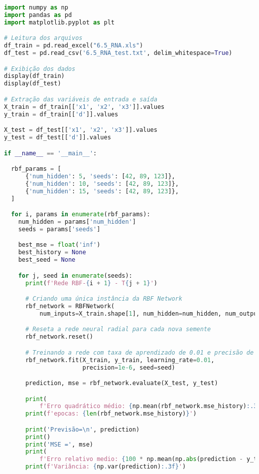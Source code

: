 \vspace{8pt}
\begin{lstlisting}[language=Python, caption={Implementação dos experimentos.}]
import numpy as np
import pandas as pd
import matplotlib.pyplot as plt

# Leitura dos arquivos
df_train = pd.read_excel("6.5_RNA.xls")
df_test = pd.read_csv('6.5_RNA_test.txt', delim_whitespace=True)

# Exibição dos dados
display(df_train)
display(df_test)

# Extração das variáveis de entrada e saída
X_train = df_train[['x1', 'x2', 'x3']].values
y_train = df_train[['d']].values

X_test = df_test[['x1', 'x2', 'x3']].values
y_test = df_test[['d']].values

if __name__ == '__main__':

  rbf_params = [
      {'num_hidden': 5, 'seeds': [42, 89, 123]},
      {'num_hidden': 10, 'seeds': [42, 89, 123]},
      {'num_hidden': 15, 'seeds': [42, 89, 123]},
  ]

  for i, params in enumerate(rbf_params):
    num_hidden = params['num_hidden']
    seeds = params['seeds']

    best_mse = float('inf')
    best_history = None
    best_seed = None

    for j, seed in enumerate(seeds):
      print(f'Rede RBF-{i + 1} - T{j + 1}')

      # Criando uma única instância da RBF Network
      rbf_network = RBFNetwork(
          num_inputs=X_train.shape[1], num_hidden=num_hidden, num_outputs=1)

      # Reseta a rede neural radial para cada nova semente
      rbf_network.reset()

      # Treinando a rede com taxa de aprendizado de 0.01 e precisão de 1e-6
      rbf_network.fit(X_train, y_train, learning_rate=0.01,
                      precision=1e-6, seed=seed)

      prediction, mse = rbf_network.evaluate(X_test, y_test)

      print(
          f'Erro quadrático médio: {np.mean(rbf_network.mse_history):.3f}')
      print(f'epocas: {len(rbf_network.mse_history)}')

      print('Previsão=\n', prediction)
      print()
      print('MSE =', mse)
      print(
          f'Erro relativo medio: {100 * np.mean(np.abs(prediction - y_test.flatten()) / y_test.flatten()):.3f}')
      print(f'Variância: {np.var(prediction):.3f}')


\end{lstlisting}
